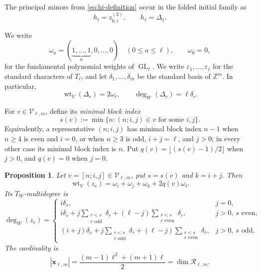 \documentclass[11pt]{amsart}
\newtheorem{proposition}[theorem]{Proposition}
\theoremstyle{definition}
\theoremstyle{remark}
\newcommand{\GL}{\operatorname{GL}}
\newcommand{\cR}{\mathcal R}
\newcommand{\wt}{\operatorname{wt}}
\begin{document}
The principal minors from \eqref{eq:hi-definition} occur in the folded initial
family as
\[ h_i=z_{0,i}^{(2)},\qquad h_\ell=\Delta_1. \]

We write
\[ \omega_a=(\underbrace{1,\ldots,1}_{a},0,\ldots,0) \quad(0\le a\le\ell), \qquad \omega_0=0, \]
for the fundamental polynomial weights of $\GL_\ell$.  We write
$\varepsilon_1,\ldots,\varepsilon_\ell$ for the standard characters of
$T_\ell$, and let $\delta_1,\ldots,\delta_m$ be the standard basis of
$\mathbb Z^m$.  In particular,
\[ \wt_V(\Delta_r)=2\omega_\ell, \qquad \deg_W(\Delta_r)=\ell\delta_r. \]

For $v\in\mathscr V_{\ell,m}$, define its \emph{minimal block index}
\[ s(v):=\min\{n:(n;i,j)\in v\text{ for some }i,j\}. \]
Equivalently, a representative $(n;i,j)$ has minimal block index $n-1$ when
$n\ge4$ is even and $i=0$, or when $n\ge3$ is odd, $i+j=\ell$, and
$j>0$; in every other case its minimal block index is $n$.  Put
$q(v)=\lfloor(s(v)-1)/2\rfloor$ when $j>0$, and $q(v)=0$ when $j=0$.

\begin{proposition}
\label{prop:weights-count}
Let $v=[n;i,j]\in\mathscr V_{\ell,m}$, put $s=s(v)$ and $k=i+j$.  Then
\begin{equation}
 \wt_V(z_v)=\omega_i+\omega_j+\omega_k+2q(v)\omega_\ell.
 \label{eq:V-weight}
\end{equation}
Its $T_W$-multidegree is
\begin{equation}
 \deg_W(z_v)=
 \begin{cases}
  i\delta_s,&j=0,\\[1mm]
  i\delta_s
  +j\displaystyle\sum_{\substack{r<s\\r\text{ odd}}}\delta_r
  +(\ell-j)\displaystyle\sum_{\substack{r<s\\r\text{ even}}}\delta_r,
  &j>0,\ s\text{ even},\\[4mm]
  (i+j)\delta_s
  +j\displaystyle\sum_{\substack{r<s\\r\text{ odd}}}\delta_r
  +(\ell-j)\displaystyle\sum_{\substack{r<s\\r\text{ even}}}\delta_r,
  &j>0,\ s\text{ odd}.
 \end{cases}
 \label{eq:W-degree}
\end{equation}
The cardinality is
\[ |\mathbf x_{\ell,m}| =\frac{(m-1)\ell^2+(m+1)\ell}{2} =\dim\cR_{\ell,m}. \]
\end{proposition}
\end{document}
